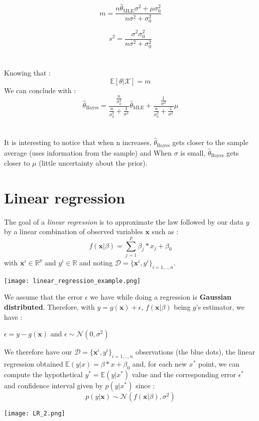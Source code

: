 \documentclass[a4paper,12pt]{article}
\newcommand{\dd}{\mathcal{D}}
\newcommand{\xx}{{\bm x}}
\begin{document}
\[m = \frac{n\hat{\theta}_{\mbox{MLE}}\sigma^2+\mu\sigma_0^2}{n\sigma^2+\sigma_0^2}
\]

\[s^2 = \frac{\sigma^2\sigma_0^2}{n\sigma^2+\sigma_0^2}
\]\\
\\
Knowing that :
\[\mathbb{E}[\theta|\mathcal{X}]=m\]
We can conclude with :
\[\hat{\theta}_{\mbox{Bayes}}=\frac{\frac{n}{\sigma_0^2}}{\frac{n}{\sigma_0^2}+\frac{1}{\sigma^2}}\hat{\theta}_{\mbox{MLE}}+\frac{\frac{1}{\sigma^2}}{\frac{n}{\sigma_0^2}+\frac{1}{\sigma^2}}\mu
\]\\
\\
It is interesting to notice that when n increases, $\hat{\theta}_{\mbox{Bayes}}$ gets closer to the sample average (uses
information from the sample) and When $\sigma$ is small, $\hat{\theta}_{\mbox{Bayes}}$ gets closer to $\mu$ (little uncertainty
about the prior). 

\section{Linear regression}

The goal of a {\em linear regression} is to approximate the law followed by our data \(\textit{y}\) by a linear combination of observed variables \(\xx\) such as :
\[ f(\xx|\beta)= \displaystyle\sum_{j=1}^{p} \beta_j*x_j + \beta_0\]
with \(\xx^i \in \mathbb{R}^p\)  and \(\textit{y}^i \in \mathbb{R}\) and noting \(\dd = {\{\xx^i,\textit{y}^i\}}_{\textit{i}=1,..,\textit{n}}\). 
\begin{center}
\texttt{[image: linear\_regression\_example.png]}
\end{center}

We assume that the error \(\epsilon\) we have while doing a regression is \textbf{Gaussian distributed}. Therefore, with \(y = g(\xx) + \epsilon \),  \(f(\xx|\beta)\) being \(g\)'s estimator, we have : 
\begin{center}
\(\epsilon = y - g(\xx)\) and \(\epsilon\sim{}\mathcal{N}(0,{\sigma}^2)\)
\end{center}

We therefore have our \(\dd = {\{\xx^i,\textit{y}^i\}}_{\textit{i}=1,..,\textit{n}}\) observations (the blue dots), the linear regression obtained \(\mathbb{E}(y|x) = \beta*x + \beta_0\) and, for each new \(x^*\) point, we can compute the hypothetical \(y^* = \mathbb{E}(y|x^*)\) value and the corresponding error \(\epsilon^* \) and confidence interval given by \(p(y|x^*)\) since : 
\[p(y|\xx)\sim{}\mathcal{N}(f(\xx|\beta),{\sigma}^2)\]
\begin{center}
\texttt{[image: LR\_2.png]}
\end{center}
\end{document}
